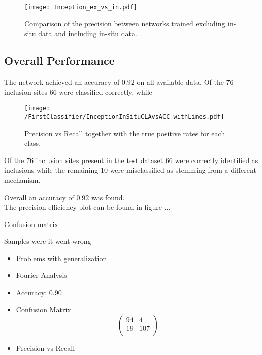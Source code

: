 \begin{figure}
  \texttt{[image: Inception\_ex\_vs\_in.pdf]}
\caption{Comparison of the precision between networks trained excluding in-situ data and including in-situ data.}
\label{fig:Inception_ex_vs_in}
\end{figure}

\subsection{Overall Performance}
The network achieved an accuracy of $0.92$ on all available data. Of the $76$ inclusion sites $66$ were classified correctly, while 


\begin{figure}
\texttt{[image: /FirstClassifier/InceptionInSituCLAvsACC\_withLines.pdf]}
\caption{Precision vs Recall together with the true positive rates for each class. }
\label{fig:FirstClassifierInSitu}
\end{figure}


Of the $76$ inclusion sites present in the test dataset $66$ were correctly identified as inclusions while the remaining $10$ were misclassified as stemming from a different mechanism. 


Overall an accuracy of $0.92$ was found. \\

The precision efficiency plot can be found in figure ...

Confusion matrix

Samples were it went wrong

\begin{itemize}
\item Problems with generalization
\item Fourier Analysis
\item Accuracy: $0.90$
\item Confusion Matrix
\begin{equation}
\begin{pmatrix}
94 & 4 \\
19&107 \\
\end{pmatrix}
\end{equation}
\item Precision vs Recall
\end{itemize}

